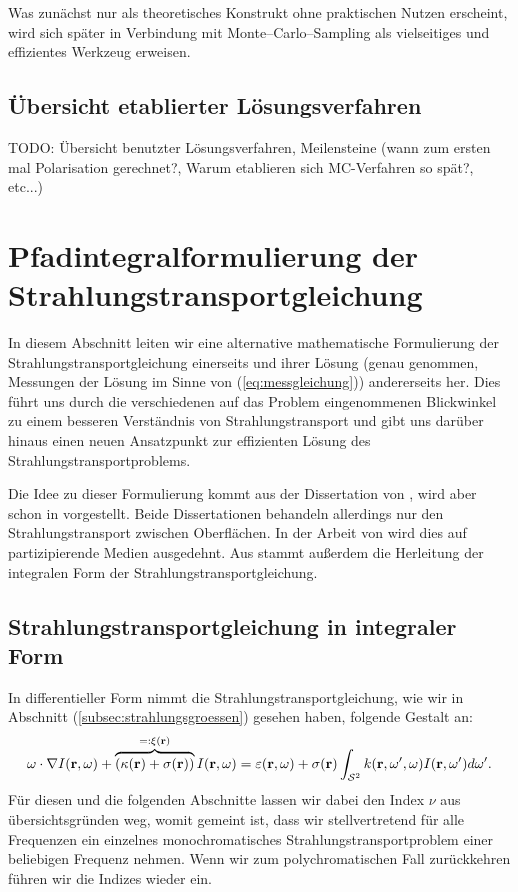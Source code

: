 	Was zunächst nur als theoretisches Konstrukt ohne praktischen Nutzen erscheint, wird sich später in Verbindung mit Monte--Carlo--Sampling als vielseitiges und effizientes Werkzeug erweisen.
	
	
	\section{Übersicht etablierter Lösungsverfahren}
	TODO: Übersicht benutzter Lösungsverfahren, Meilensteine (wann zum ersten mal Polarisation gerechnet?, Warum etablieren sich MC-Verfahren so spät?, etc...)
		
	\chapter{Pfadintegralformulierung der Strahlungstransportgleichung}\label{chapter:path_radiative_transfer}
	In diesem Abschnitt leiten wir eine alternative mathematische Formulierung der Strahlungstransportgleichung einerseits und ihrer Lösung (genau genommen, Messungen der Lösung im Sinne von (\ref{eq:messgleichung})) andererseits her. Dies führt uns durch die verschiedenen auf das Problem eingenommenen Blickwinkel zu einem besseren Verständnis von Strahlungstransport und gibt uns darüber hinaus einen neuen Ansatzpunkt zur effizienten Lösung des Strahlungstransportproblems.
	
	Die Idee zu dieser Formulierung kommt aus der Dissertation von \citet{Veach:1997p9136}, wird aber schon in \citep{Arvo:1995p9257} vorgestellt. Beide Dissertationen behandeln allerdings nur den Strahlungstransport zwischen Oberflächen. In der Arbeit von \citet{Pauly:2000p5705} wird dies auf partizipierende Medien ausgedehnt. Aus \citep{Arvo:1993p9035} stammt außerdem die Herleitung der integralen Form der Strahlungstransportgleichung.
	
	
	\section{Strahlungstransportgleichung in integraler Form}
	In differentieller Form nimmt die Strahlungstransportgleichung, wie wir in Abschnitt (\ref{subsec:strahlungsgroessen}) gesehen haben, folgende Gestalt an:
		\begin{equation}
			\omega \cdot \nabla I(\mathbf{r},\omega)+\overbrace{\left(\kappa(\mathbf{r})+\sigma(\mathbf{r})\right)}^{=:\xi(\mathbf{r})}I(\mathbf{r},\omega)=\varepsilon(\mathbf{r},\omega)+\sigma(\mathbf{r}) \int_{\mathcal{S}^2} k(\mathbf{r},\omega',\omega)I(\mathbf{r},\omega') d\omega'.
			\label{eq:diff.STG}
		\end{equation}
	Für diesen und die folgenden Abschnitte lassen wir dabei den Index $\nu$ aus übersichtsgründen weg, womit gemeint ist, dass wir stellvertretend für alle Frequenzen ein einzelnes monochromatisches Strahlungstransportproblem einer beliebigen Frequenz nehmen. Wenn wir zum polychromatischen Fall zurückkehren führen wir die Indizes wieder ein.
	
